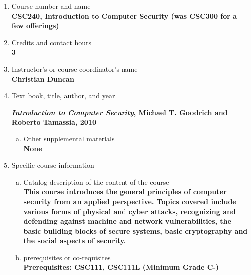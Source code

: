 \label{CSC240}  %
\begin{enumerate}[1.]
\item Course number and name\\
  {\bfseries
    CSC240, Introduction to Computer Security (was CSC300 for a few offerings)
  }
  
\item Credits and contact hours\\
  {\bfseries
    3    
  }

\item Instructor's or course coordinator's name\\
  {\bfseries
    Christian Duncan    
  }

\item Text book, title, author, and year\\
  {\bfseries
    {\em Introduction to Computer Security}, Michael T. Goodrich and Roberto Tamassia, 2010
    
  }
\begin{enumerate}[a.]
\item Other supplemental materials\\
  {\bfseries
    None    
  }
\end{enumerate}

\item Specific course information
\begin{enumerate}[a.]  
\item Catalog description of the content of the course\\
  {\bfseries
This course introduces the general principles of computer security from an applied perspective. Topics covered include various forms of physical and cyber attacks, recognizing and defending against machine and network vulnerabilities, the basic building blocks of secure systems, basic cryptography and the social aspects of security.
}

\item prerequisites or co-requisites\\
  {\bfseries
    Prerequisites: CSC111, CSC111L (Minimum Grade C-)
  }


\end{enumerate}
\end{enumerate}

